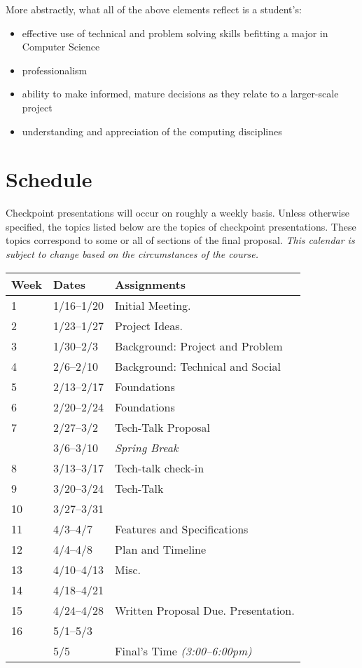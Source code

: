 \documentclass[10pt]{article}
\begin{document}
More abstractly, what all of the above elements reflect is a student's:
\begin{itemize}
\item effective use of technical and problem solving skills befitting a major in Computer Science
\item professionalism
\item ability to make informed, mature decisions as they relate to a larger-scale project
\item understanding and appreciation of the computing disciplines
\end{itemize}


\section{Schedule}

Checkpoint presentations will occur on roughly a weekly basis. Unless otherwise specified, the topics listed below are the topics of checkpoint presentations. These topics correspond to some or all of sections of the final proposal. \textit{This calendar is subject to change based on the circumstances of the course.}

\begin{center}
\begin{tabular}{lll}
Week & Dates & Assignments \\ \toprule
1 & 1/16--1/20 &  Initial Meeting.  \\
2 & 1/23--1/27 & Project Ideas. \\
3 & 1/30--2/3 & Background: Project and Problem \\
4 & 2/6--2/10 & Background: Technical and Social \\
5 & 2/13--2/17 & Foundations \\
6 & 2/20--2/24 & Foundations  \\
7 & 2/27--3/2 & Tech-Talk Proposal \\
 & 3/6--3/10 & \textit{Spring Break} \\
8 & 3/13--3/17  & Tech-talk check-in \\
9 & 3/20--3/24 & Tech-Talk   \\
10 & 3/27--3/31 &  \\
11 & 4/3--4/7 &  Features and Specifications\\
12 & 4/4--4/8 &  Plan and Timeline   \\
13 & 4/10--4/13 & Misc. \\
14 & 4/18--4/21 & \\
15 & 4/24--4/28 & Written Proposal Due. Presentation. \\
16 & 5/1--5/3 &   \\ \midrule
  & 5/5 & Final's Time \textit{(3:00--6:00pm)}  \\
\end{tabular}
\end{center}
\end{document}

